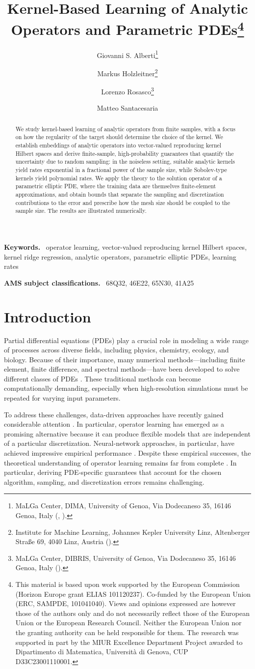 \documentclass[11pt]{article}
\title{Kernel-Based Learning of Analytic Operators and Parametric
PDEs\thanks{This material is based upon work supported by the European Commission (Horizon Europe grant
ELIAS 101120237). Co-funded by the European Union (ERC, SAMPDE, 101041040). Views and opinions expressed are however those of the authors only and do not necessarily reflect those of the European Union or the European Research Council. Neither the European Union nor the granting authority can be held responsible for them. The research was supported in part by the MIUR Excellence Department Project awarded to Dipartimento di Matematica, Università di Genova, CUP D33C23001110001.}}
\author{Giovanni S. Alberti\thanks{MaLGa Center, DIMA,
University of Genoa, Via Dodecaneso 35, 16146 Genoa, Italy
(\email{giovanni.alberti@unige.it}, \email{matteo.santacesaria@unige.it}).}
\and Markus Holzleitner\thanks{Institute for Machine Learning, Johannes
Kepler University Linz, Altenberger Stra\ss e 69, 4040 Linz, Austria
(\email{holzleitner@ml.jku.at}).}
\and Lorenzo Rosasco\thanks{MaLGa Center, DIBRIS,
University of Genoa, Via Dodecaneso 35, 16146 Genoa, Italy
(\email{lorenzo.rosasco@unige.it}).}
\and Matteo Santacesaria\footnotemark[2]}
\numberwithin{equation}{section}
\theoremstyle{plain}
\theoremstyle{definition}
\theoremstyle{remark}
\newenvironment{keywords}{\par\medskip\noindent\textbf{Keywords.}\ }{\par}
\newenvironment{AMS}{\par\smallskip\noindent\textbf{AMS subject classifications.}\ }{\par}
\begin{document}
\maketitle

\begin{abstract}
We study kernel-based learning of analytic operators from finite samples,
with a focus on how the regularity of the target should determine the
choice of the kernel. We establish embeddings of analytic operators into
vector-valued reproducing kernel Hilbert spaces and derive finite-sample,
high-probability guarantees that quantify the uncertainty due to random
sampling: in the noiseless setting, suitable analytic kernels yield rates
exponential in a fractional power of the sample size, while Sobolev-type
kernels yield polynomial rates. We apply the theory to the solution
operator of a parametric elliptic PDE, where the training data are
themselves finite-element approximations, and obtain bounds that separate
the sampling and discretization contributions to the error and prescribe
how the mesh size should be coupled to the sample size. The results are
illustrated numerically.
\end{abstract}

\begin{keywords}
operator learning, vector-valued reproducing kernel Hilbert spaces, kernel
ridge regression, analytic operators, parametric elliptic PDEs, learning rates
\end{keywords}

\begin{AMS}
68Q32, 46E22, 65N30, 41A25
\end{AMS}

\section{Introduction}

Partial differential equations (PDEs) play a crucial role in modeling a wide
range of processes across diverse fields, including physics, chemistry,
ecology, and biology. Because of their importance, many numerical
methods---including finite element, finite difference, and spectral
methods---have been developed to solve different classes of PDEs
\cite{quarteroni2009numerical}. These traditional methods can become
computationally demanding, especially when high-resolution simulations must be
repeated for varying input parameters.

To address these challenges, data-driven approaches have recently gained
considerable attention \cite{mishra2024numerical}. In particular, operator
learning has emerged as a promising alternative because it can produce
flexible models that are independent of a particular discretization.
Neural-network approaches, in particular, have achieved impressive empirical
performance \cite{alkin2024universal, herde2024poseidon, hao2024dpot}. Despite
these empirical successes, the theoretical understanding of operator learning
remains far from complete \cite{kovachki2024operator, subedi2025operator}. In
particular, deriving PDE-specific guarantees that account for the chosen
algorithm, sampling, and discretization errors remains challenging.
\end{document}
